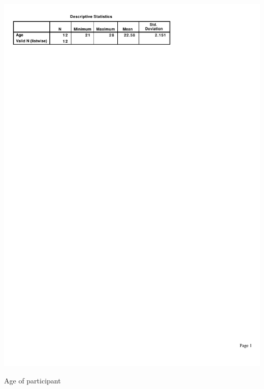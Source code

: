 \documentclass[a4paper, 12pt]{report}
\begin{document}
\begin{table}[ht]
\centerline{\includegraphics{figures/Age.pdf}}
\caption{Age of participant}
\label{fig:partic_age}
\end{table}
\end{document}
